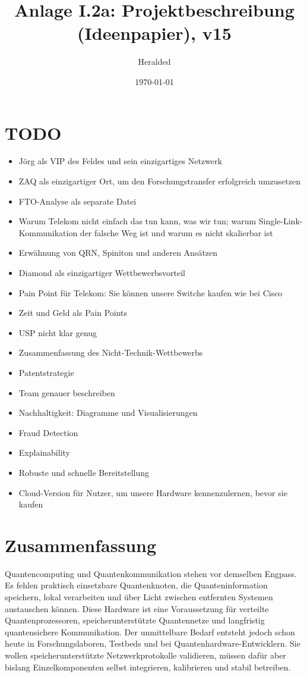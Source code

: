 \documentclass[11pt,oneside]{scrartcl}
\title{Anlage I.2a: Projektbeschreibung (Ideenpapier), v15}
\author{Heralded}
\date{\today}
\begin{document}
\maketitle

\section*{TODO}
\begin{itemize}
  \item J\"org als VIP des Feldes und sein einzigartiges Netzwerk
  \item ZAQ als einzigartiger Ort, um den Forschungstransfer erfolgreich umzusetzen
  \item FTO-Analyse als separate Datei
  \item Warum Telekom nicht einfach das tun kann, was wir tun; warum Single-Link-Kommunikation der falsche Weg ist und warum es nicht skalierbar ist
  \item Erw\"ahnung von QRN, Spiniton und anderen Ans\"atzen
  \item Diamond als einzigartiger Wettbewerbsvorteil
  \item Pain Point f\"ur Telekom: Sie k\"onnen unsere Switche kaufen wie bei Cisco
  \item Zeit und Geld als Pain Points
  \item USP nicht klar genug
  \item Zusammenfassung des Nicht-Technik-Wettbewerbs
  \item Patentstrategie
  \item Team genauer beschreiben
  \item Nachhaltigkeit: Diagramme und Visualisierungen
  \item Fraud Detection
  \item Explainability
  \item Robuste und schnelle Bereitstellung
  \item Cloud-Version f\"ur Nutzer, um unsere Hardware kennenzulernen, bevor sie kaufen
\end{itemize}

\tableofcontents
\clearpage

\section{Zusammenfassung}
Quantencomputing und Quantenkommunikation stehen vor demselben Engpass. Es fehlen praktisch einsetzbare Quantenknoten, die Quanteninformation speichern, lokal verarbeiten und \"uber Licht zwischen entfernten Systemen austauschen k\"onnen. Diese Hardware ist eine Voraussetzung f\"ur verteilte Quantenprozessoren, speicherunterst\"utzte Quantennetze und langfristig quantensichere Kommunikation. Der unmittelbare Bedarf entsteht jedoch schon heute in Forschungslaboren, Testbeds und bei Quantenhardware-Entwicklern. Sie wollen speicherunterst\"utzte Netzwerkprotokolle validieren, m\"ussen daf\"ur aber bislang Einzelkomponenten selbst integrieren, kalibrieren und stabil betreiben.
\end{document}
